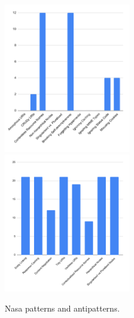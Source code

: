 \begin{figure}[htb!]

\includegraphics[width=0.5\textwidth]{img/barchart/nasaBarAnti.pdf}
\includegraphics[width=0.5\textwidth]{img/barchart/nasaBarPatt.pdf}
\caption{Nasa patterns and antipatterns.}
\label{fig:nasaBarPatt}

\end{figure}

